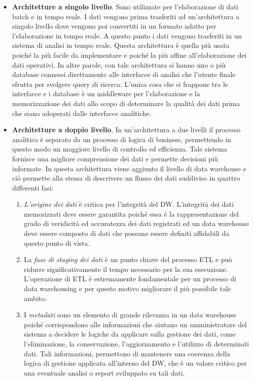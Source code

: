 \begin{itemize}
    \item \textbf{Architetture a singolo livello}. Sono utilizzate per l'elaborazione di dati batch e in tempo reale. I dati vengono prima trasferiti ad un'architettura a singolo livello dove vengono poi convertiti in un formato adatto per l'elaborazione in tempo reale. A questo punto i dati vengono trasferiti in un sistema di analisi in tempo reale. Questa architettura è quella più usata poiché la più facile da implementare e poiché la più affine all'elaborazione dei dati operativi. In altre parole, con tale architettura si hanno uno o più database connessi direttamente alle interfacce di analisi che l'utente finale sfrutta per svolgere query di ricerca. L'unica cosa che si frappone tra le interfacce e i database è un middleware per l'elaborazione e la memorizzazione dei dati allo scopo di determinare la qualità dei dati prima che siano adoperati dalle interfacce analitiche.
    \item \textbf{Architetture a doppio livello}. In un'architettura a due livelli il processo analitico è separato da un processo di logica di business, permettendo in questo modo un maggiore livello di controllo ed efficienza. Tale sistema fornisce una migliore comprensione dei dati e permette decisioni più informate. In questa architettura viene aggiunto il livello di data warehouse e ciò permette alla stessa di descrivere un flusso dei dati suddiviso in quattro differenti fasi:
        \begin{enumerate}
            \item \textit{L'origine dei dati} è critica per l'integrità del DW. L'integrità dei dati memorizzati deve essere garantita poiché essa è la rappresentazione del grado di veridicità ed accuratezza dei dati registrati ed un data warehouse deve essere composto di dati che possano essere definiti affidabili da questo punto di vista.
            \item La \textit{fase di staging dei dati} è un punto chiave del processo ETL e può ridurre significativamente il tempo necessario per la sua esecuzione. L'operazione di ETL è estremamente fondamentale per un processo di data warehousing e per questo motivo migliorare il più possibile tale ambito.
            \item I \textit{metadati} sono un elemento di grande rilevanza in un data warehouse poiché corrispondono alle informazioni che aiutano un amministratore del sistema a decidere le logiche da applicare sulla gestione dei dati, come l'eliminazione, la conservazione, l'aggiornamento e l'utilizzo di determinati dati. Tali informazioni, permettono di mantenere una coerenza della logica di gestione applicata all'interno del DW, che è un valore critico per una eventuale analisi o report sviluppato su tali dati.

\end{enumerate}
\end{itemize}
